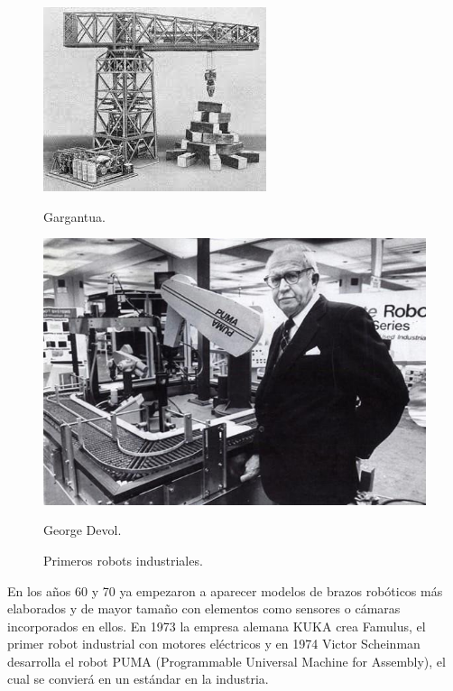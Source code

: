 \begin{figure}[ht!]
	\centering
	\begin{minipage}{0.44\linewidth}
		\centering
		\includegraphics[width=\linewidth]{figs/gargantua.jpg}
		\caption*{\centering Gargantua.}
	\end{minipage}
	\begin{minipage}{0.52\linewidth}
		\centering
		\includegraphics[width=\linewidth]{figs/George_Devol}
		\caption*{\centering George Devol.} 
	\end{minipage}
	\caption{Primeros robots industriales.}
	\label{fig:ancientrel}
\end{figure}

En los años 60 y 70 ya empezaron a aparecer modelos de brazos robóticos más elaborados y de mayor tamaño con elementos como sensores o cámaras incorporados en ellos. En 1973 la empresa alemana KUKA crea Famulus, el primer robot industrial con motores eléctricos y en 1974 Victor Scheinman desarrolla el robot PUMA (Programmable Universal Machine for Assembly), el cual se convierá en un estándar en la industria. \\

